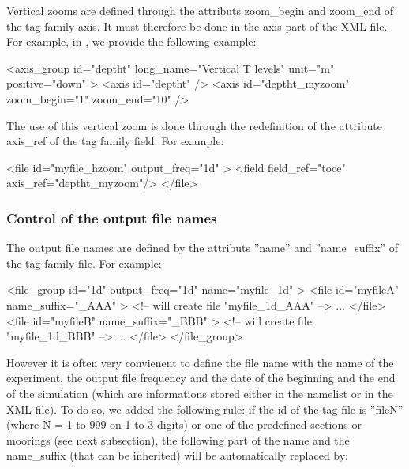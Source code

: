 \documentclass[../main/NEMO_manual]{subfiles}
\begin{document}
Vertical zooms are defined through the attributs zoom\_begin and zoom\_end of the tag family axis.
It must therefore be done in the axis part of the XML file.
For example, in , we provide the following example:

\begin{xmllines}
<axis_group id="deptht" long_name="Vertical T levels" unit="m" positive="down" >
	<axis id="deptht" />
	<axis id="deptht_myzoom" zoom_begin="1" zoom_end="10" />
\end{xmllines}

The use of this vertical zoom is done through the redefinition of the attribute axis\_ref of the tag family field.
For example:

\begin{xmllines}
<file id="myfile_hzoom" output_freq="1d" >
	<field field_ref="toce" axis_ref="deptht_myzoom"/>
</file>
\end{xmllines}

\subsubsection{Control of the output file names}

The output file names are defined by the attributs ''name'' and ''name\_suffix'' of the tag family file.
For example:

\begin{xmllines}
<file_group id="1d" output_freq="1d" name="myfile_1d" > 
	<file id="myfileA" name_suffix="_AAA" > <!-- will create file "myfile_1d_AAA"  -->
		...
	</file>
	<file id="myfileB" name_suffix="_BBB" > <!-- will create file "myfile_1d_BBB" -->
		...
	</file>
</file_group>
\end{xmllines}

However it is often very convienent to define the file name with the name of the experiment,
the output file frequency and the date of the beginning and the end of the simulation
(which are informations stored either in the namelist or in the XML file).
To do so, we added the following rule:
if the id of the tag file is ''fileN'' (where N = 1 to 999 on 1 to 3 digits) or
one of the predefined sections or moorings (see next subsection),
the following part of the name and the name\_suffix (that can be inherited) will be automatically replaced by:
\end{document}

